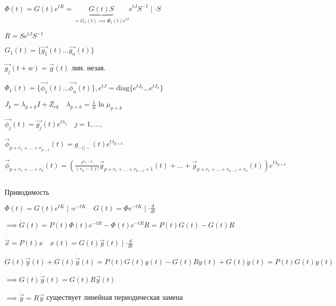 \documentclass[12pt, a4paper]{article}
\begin{document}
    $\Phi(t) = G(t)e^{tR} = \underbrace{G(t)S}_{=G_1(t)\implies \Phi_1(t)e^{tJ}}e^{tJ}S^{-1} \mid \cdot S$

    $R = Se^{tJ}S^{-1}$

    $G_1(t) = \{ \vec{g_1}(t) \dotsc \vec{g_n}(t)\}$

    $\vec{g_j}(t+w) = \vec{g}(t)$ лин. незав.

    $\Phi_1(t) = \{ \vec{\phi_1}(t) \dotsc \vec{\phi_n}(t) \}, 
    e^{tJ} = \text{diag} \{ e^{tJ_0} \dotsc e^{tJ_a} \}
    $

    $J_k = \lambda_{p+k}I + Z_{rk} \quad \lambda_{p+k} = \frac{1}{w}\ln \mu_{p+k}$

    $\vec{\phi_j}(t) = \vec{g_j}(t)e^{t\lambda_j} \quad j = 1, \dotsc,  $

    $\vec{\phi}_{p+r_1 + \dotsc + r_{p-1}}(t) = g_{-||-}(t)e^{t\lambda_{p+k}}$

    $\vec{\phi}_{p+r_1+ \dotsc + r_k}(t) = 
    (\frac{t^{r_n-1}}{(r_k - 1)!}\vec{g}_{p+r_1+\dotsc+r_{k-1} + 1}(t) + 
    \dotsc + \vec{g}_{p+r_1+\dotsc+r_{k-1}+r_k}(t))e^{t\lambda_{p+k}}$

    \par $ $

    Приводимость

    $\Phi(t) = G(t)e^{tK} \mid \cdot e^{-tK} \quad G(t) = 
    \Phi e^{-tK} \mid \cdot \frac{d}{dt}$

    $\implies \dot{G}(t) = P(t)\Phi(t)e^{-tR} - \Phi(t)e^{-tR}R = 
    P(t)G(t) - G(t)R$

    $\dot{\vec{x}} = P(t)x \quad x(t) = G(t)\vec{y}(t) \mid \cdot \frac{d}{dt}$

    $\dot{G}(t)\vec{y}(t) + G(t) \dot{\vec{y}}(t) = 
    P(t)G(t)y(t) - G(t)Ry(t) + G(t)\dot y(t) = 
    P(t)G(t)y(t)$

    $\implies G(t)\dot{\vec{y}}(t) = G(t) R \vec{y}(t)$

    $\implies \dot{\vec{y}} = R \vec{y}$ существует линейная периодическая замена
\end{document}
